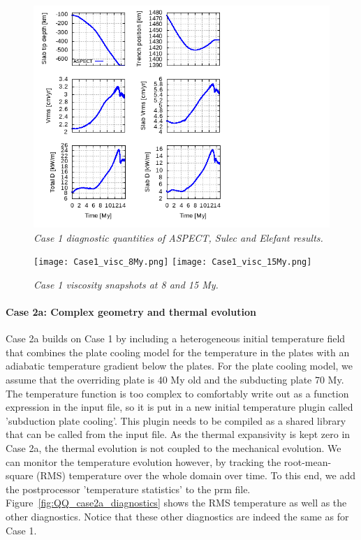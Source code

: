 \begin{figure}
    \centering
    \includegraphics[trim=1cm 1cm 10cm 0cm,width=.8\textwidth]{Case1_diagnostics}
    \caption{\it Case 1 diagnostic quantities of ASPECT, Sulec and Elefant results.}
    \label{fig:QQ_case1_diagnostics}
\end{figure}

\begin{figure}
    \centering
    \texttt{[image: Case1\_visc\_8My.png]}
    \texttt{[image: Case1\_visc\_15My.png]}
    \caption{\it Case 1 viscosity snapshots at 8 and 15 My.}
    \label{fig:QQ_case1_results}
\end{figure}

\paragraph{Case 2a: Complex geometry and thermal evolution}
Case 2a builds on Case 1 by including a heterogeneous initial temperature field that combines the plate cooling model for the temperature in the plates with an adiabatic temperature gradient below the plates. For the plate cooling model, we assume that the overriding plate is 40 My old and the subducting plate 70 My. The temperature function is too complex to comfortably write out as a function expression in the input file, so it is put in a new initial temperature plugin called 'subduction plate cooling'. This plugin needs to be compiled as a shared library that can be called from the input file.
As the thermal expansivity is kept zero in Case 2a, the thermal evolution is not coupled to the mechanical evolution. We can monitor the temperature evolution however, by tracking the root-mean-square (RMS) temperature over the whole domain over time. To this end, we add the postprocessor 'temperature statistics' to the prm file. Figure~\ref{fig:QQ_case2a_diagnostics} shows the RMS temperature as well as the other diagnostics. Notice that these other diagnostics are indeed the same as for Case 1. 

